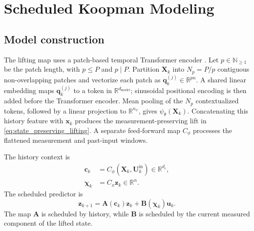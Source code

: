 \documentclass[journal]{IEEEtran}
\newcommand{\vx}{\mathbf{x}}
\newcommand{\vu}{\mathbf{u}}
\newcommand{\vz}{\mathbf{z}}
\newcommand{\vc}{\mathbf{c}}
\newcommand{\vq}{\mathbf{q}}
\newcommand{\vchi}{\boldsymbol{\chi}}
\newcommand{\mA}{\mathbf{A}}
\newcommand{\mB}{\mathbf{B}}
\newcommand{\mU}{\mathbf{U}}
\newcommand{\mX}{\mathbf{X}}
\newcommand{\R}{\mathbb{R}}
\begin{document}
\section{Scheduled Koopman Modeling}
\label{sec:model}

\subsection{Model construction}

The lifting map uses a patch-based temporal Transformer encoder \cite{vaswani2017attention,nie2023time}. Let $p\in\mathbb N_{\ge1}$ be the patch length, with $p\le P$ and $p\mid P$. Partition $\mX_k$ into $N_p=P/p$ contiguous non-overlapping patches and vectorize each patch as $\vq_k^{(j)}\in\R^{pn}$. A shared linear embedding maps $\vq_k^{(j)}$ to a token in $\R^{d_{\mathrm{model}}}$; sinusoidal positional encoding is then added before the Transformer encoder. Mean pooling of the $N_p$ contextualized tokens, followed by a linear projection to $\R^{n_\psi}$, gives $\psi_\theta(\mX_k)$. Concatenating this history feature with $\vx_k$ produces the measurement-preserving lift in \eqref{eq:state_preserving_lifting}. A separate feed-forward map $C_\phi$ processes the flattened measurement and past-input windows.

The history context is
\begin{align}
    \vc_k&=C_\phi(\mX_k,\mU_k^{\mathrm{in}})\in\R^{d_c},
    \label{eq:history_context}\\
    \vchi_k&=C_x\vz_k\in\R^n.
    \label{eq:scheduling_variables}
\end{align}
The scheduled predictor is
\begin{equation}
    \vz_{k+1}=\mA(\vc_k)\vz_k+\mB(\vchi_k)\vu_k.
    \label{eq:scheduled_predictor}
\end{equation}
The map $\mA$ is scheduled by history, while $\mB$ is scheduled by the current measured component of the lifted state.
\end{document}
